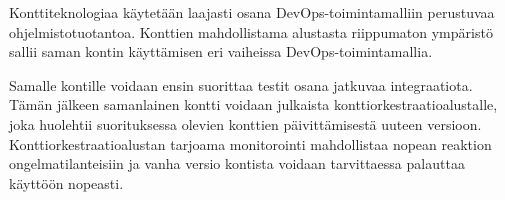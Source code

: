 Konttiteknologiaa käytetään laajasti osana DevOps-toimintamalliin perustuvaa ohjelmistotuotantoa. Konttien mahdollistama alustasta riippumaton ympäristö sallii saman kontin käyttämisen eri vaiheissa DevOps-toimintamallia. \cite{Kang16}

Samalle kontille voidaan ensin suorittaa testit osana jatkuvaa integraatiota. Tämän jälkeen samanlainen kontti voidaan julkaista konttiorkestraatioalustalle, joka huolehtii suorituksessa olevien konttien päivittämisestä uuteen versioon. Konttiorkestraatioalustan tarjoama monitorointi mahdollistaa nopean reaktion ongelmatilanteisiin ja vanha versio kontista voidaan tarvittaessa palauttaa käyttöön nopeasti. \cite{Watada19, Kang16}
